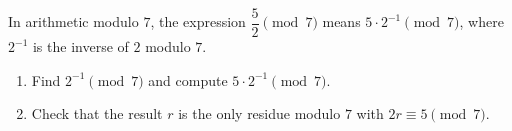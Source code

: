 In arithmetic modulo $7$, the expression $\dfrac52\pmod 7$ means $5\cdot2^{-1}\pmod7$, where $2^{-1}$ is the inverse of $2$ modulo $7$.
\begin{enumerate}
\item[(a)] Find $2^{-1}\pmod7$ and compute $5\cdot2^{-1}\pmod7$.
\item[(b)] Check that the result $r$ is the only residue modulo $7$ with $2r\equiv5\pmod7$.
\end{enumerate}
